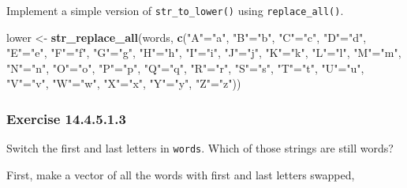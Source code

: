 \documentclass[]{book}
\newenvironment{Shaded}{\begin{snugshade}}{\end{snugshade}}
\newcommand{\KeywordTok}[1]{\textcolor[rgb]{0.13,0.29,0.53}{\textbf{#1}}}
\newcommand{\NormalTok}[1]{#1}
\newcommand{\StringTok}[1]{\textcolor[rgb]{0.31,0.60,0.02}{#1}}
\theoremstyle{plain}
\theoremstyle{remark}
\begin{document}
Implement a simple version of \texttt{str\_to\_lower()} using
\texttt{replace\_all()}.

\begin{Shaded}
\begin{Highlighting}[]
\NormalTok{lower <-}\StringTok{ }\KeywordTok{str_replace_all}\NormalTok{(words, }\KeywordTok{c}\NormalTok{(}\StringTok{"A"}\NormalTok{=}\StringTok{"a"}\NormalTok{, }\StringTok{"B"}\NormalTok{=}\StringTok{"b"}\NormalTok{, }\StringTok{"C"}\NormalTok{=}\StringTok{"c"}\NormalTok{, }\StringTok{"D"}\NormalTok{=}\StringTok{"d"}\NormalTok{, }\StringTok{"E"}\NormalTok{=}\StringTok{"e"}\NormalTok{, }\StringTok{"F"}\NormalTok{=}\StringTok{"f"}\NormalTok{, }\StringTok{"G"}\NormalTok{=}\StringTok{"g"}\NormalTok{, }\StringTok{"H"}\NormalTok{=}\StringTok{"h"}\NormalTok{, }\StringTok{"I"}\NormalTok{=}\StringTok{"i"}\NormalTok{, }\StringTok{"J"}\NormalTok{=}\StringTok{"j"}\NormalTok{, }\StringTok{"K"}\NormalTok{=}\StringTok{"k"}\NormalTok{, }\StringTok{"L"}\NormalTok{=}\StringTok{"l"}\NormalTok{, }\StringTok{"M"}\NormalTok{=}\StringTok{"m"}\NormalTok{, }\StringTok{"N"}\NormalTok{=}\StringTok{"n"}\NormalTok{, }\StringTok{"O"}\NormalTok{=}\StringTok{"o"}\NormalTok{, }\StringTok{"P"}\NormalTok{=}\StringTok{"p"}\NormalTok{, }\StringTok{"Q"}\NormalTok{=}\StringTok{"q"}\NormalTok{, }\StringTok{"R"}\NormalTok{=}\StringTok{"r"}\NormalTok{, }\StringTok{"S"}\NormalTok{=}\StringTok{"s"}\NormalTok{, }\StringTok{"T"}\NormalTok{=}\StringTok{"t"}\NormalTok{, }\StringTok{"U"}\NormalTok{=}\StringTok{"u"}\NormalTok{, }\StringTok{"V"}\NormalTok{=}\StringTok{"v"}\NormalTok{, }\StringTok{"W"}\NormalTok{=}\StringTok{"w"}\NormalTok{, }\StringTok{"X"}\NormalTok{=}\StringTok{"x"}\NormalTok{, }\StringTok{"Y"}\NormalTok{=}\StringTok{"y"}\NormalTok{, }\StringTok{"Z"}\NormalTok{=}\StringTok{"z"}\NormalTok{))}
\end{Highlighting}
\end{Shaded}

\hypertarget{exercise-14.4.5.1.3}{%
\subsubsection*{\texorpdfstring{Exercise
{14.4.5.1.3}}{Exercise 14.4.5.1.3}}\label{exercise-14.4.5.1.3}}

Switch the first and last letters in \texttt{words}. Which of those
strings are still words?

First, make a vector of all the words with first and last letters
swapped,
\end{document}
